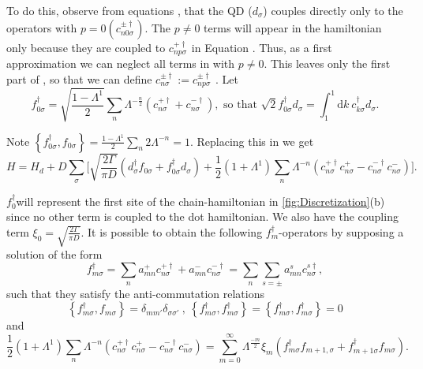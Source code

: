 To do this, observe from equations ,
that the QD ($d_{\sigma}$) couples directly only to the operators
with $p=0$$\left(c_{n0\sigma}^{\pm\dagger}\right)$. The $p\neq0$
terms will appear in the hamiltonian only because they are coupled
to $c_{np\sigma}^{+\dagger}$ in Equation .
Thus, as a first approximation we can neglect all terms in 
with $p\neq0$. This leaves only the first part of ,
so that we can define $c_{n\sigma}^{\pm\dagger}:=c_{np\sigma}^{\pm\dagger}$
. Let 
\begin{equation}
f_{0\sigma}^{\dagger}=\sqrt{\frac{1-\Lambda^{1}}{2}}\sum_{n}\Lambda^{-\frac{n}{2}}\left(c_{n\sigma}^{+\dagger}+c_{n\sigma}^{-\dagger}\right),\mbox{ so that }\sqrt{2}f_{0\sigma}^{\dagger}d_{\sigma}=\int_{1}^{1}\mbox{d}k\ c_{k\sigma}^{\dagger}d_{\sigma}.\label{eq:f_0}
\end{equation}


Note $\left\{ f_{0\sigma}^{\dagger},f_{0\sigma}\right\} =\frac{1-\Lambda^{1}}{2}\sum_{n}2\Lambda^{-n}=1$.
Replacing this in we get 
\[
H=H_{d}+D\sum_{\sigma}\Biggl[\sqrt{\frac{2\Gamma}{\pi D}}\left(d_{\sigma}^{\dagger}f_{0\sigma}+f_{0\sigma}^{\dagger}d_{\sigma}\right)+\frac{1}{2}\left(1+\Lambda^{1}\right)\sum_{n}\Lambda^{-n}\left(c_{n\sigma}^{+\dagger}c_{n\sigma}^{+}-c_{n\sigma}^{-\dagger}c_{n\sigma}^{-}\right)\Biggr].
\]


$f_{0}^{\dagger}$will represent the first site of the chain-hamiltonian
in \ref{fig:Discretization}(b) since no other term is coupled to the dot hamiltonian.
We also have the coupling term $\xi_{0}=\sqrt{\frac{2\Gamma}{\pi D}}$.
It is possible to obtain the following $f_{m}^{\dagger}$-operators
by supposing a solution of the form 
\begin{equation}
f_{m\sigma}^{\dagger}=\sum_{n}a_{mn}^{+}c_{n\sigma}^{+\dagger}+a_{mn}^{-}c_{n\sigma}^{-\dagger}=\sum_{n}\sum_{s=\pm}a_{mn}^{s}c_{n\sigma}^{s\dagger},\label{eq:chain elements}
\end{equation}
 such that they satisfy the anti-commutation relations 
\[
\left\{ f_{m\sigma}^{\dagger},f_{m\sigma}\right\} =\delta_{mm'}\delta_{\sigma\sigma'}\ ,\ \left\{ f_{m\sigma}^{\dagger},f_{m\sigma}^{\dagger}\right\} =\left\{ f_{m\sigma}^{\dagger},f_{m\sigma}^{\dagger}\right\} =0
\]
and 
\begin{equation}
\frac{1}{2}\left(1+\Lambda^{1}\right)\sum_{n}\Lambda^{-n}\left(c_{n\sigma}^{+\dagger}c_{n\sigma}^{+}-c_{n\sigma}^{-\dagger}c_{n\sigma}^{-}\right)=\sum_{m=0}^{\infty}\Lambda^{\frac{-m}{2}}\xi_{m}\left(f_{m\sigma}^{\dagger}f_{m+1,\sigma}+f_{m+1\sigma}^{\dagger}f_{m\sigma}\right).\label{eq:final equation}
\end{equation}


